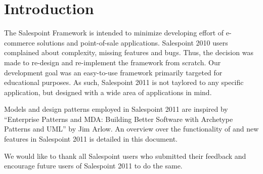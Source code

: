 \chapter{Introduction}
The Salespoint Framework is intended to minimize developing effort of e-commerce solutions and point-of-sale applications.
Salespoint 2010 users complained about complexity, missing features and bugs.
Thus, the decision was made to re-design and re-implement the framework from scratch.
Our development goal was an easy-to-use framework primarily targeted for educational purposes.
As such, Salespoint 2011 is not taylored to any specific application, but designed with a wide area of applications in mind.

Models and design patterns employed in Salespoint 2011 are inspired by ``Enterprise Patterns and MDA: Building Better Software with Archetype Patterns and UML'' by Jim Arlow.
An overview over the functionality of and new features in Salespoint 2011 is detailed in this document.

We would like to thank all Salespoint users who submitted their feedback and encourage future users of Salespoint 2011 to do the same.
